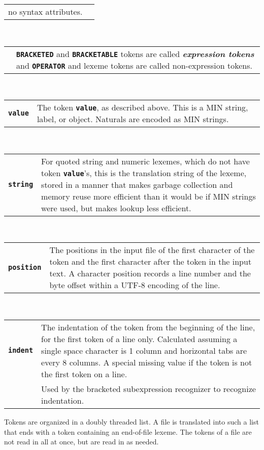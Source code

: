 \documentclass[12pt]{article}
\makeatletter
\newcommand{\TT}[1]{{\tt \bfseries #1}}
\newcommand{\skey}[2]{{\bf \em #1#2}\index{#1}}
\newcommand{\ttmkey}[2]{\TT{#1}\index{#1@{\tt #1}!#2}}
\newenvironment{indpar}[1][0.3in]%
	{\begin{list}{}%
		     {\setlength{\itemsep}{0in}%
		      \setlength{\topsep}{0in}%
		      \setlength{\parsep}{1ex}%
		      \setlength{\labelwidth}{#1}%
		      \setlength{\leftmargin}{#1}%
		      \addtolength{\leftmargin}{\labelsep}}%
	 \item}%
	{\end{list}}
\makeatother
\begin{document}
\begin{indpar}
\begin{tabular}{p{1in}p{4.5in}}
		  no syntax attri\-butes.
\end{tabular}
\\[1ex]  
\begin{tabular}{p{1in}p{4.5in}}
		& \TT{BRACKETED} and \TT{BRACKETABLE} tokens are called
		  \skey{expression token}s and \TT{OPERATOR} and lexeme
		  tokens are called non-expression tokens.
\end{tabular}
\\[1ex]
\begin{tabular}{p{1in}p{4.5in}}
\ttmkey{value}{of token}
		& The token \TT{value}, as described above.  This is
		  a MIN string, label, or object.  Naturals are encoded
		  as MIN strings.
\end{tabular}
\\[1ex]
\begin{tabular}{p{1in}p{4.5in}}
\ttmkey{string}{of token}
		& For quoted string and numeric lexemes,
		  which do not have token \TT{value}'s,
                  this is the translation string of the lexeme,
		  stored in a manner that makes
		  garbage collection and memory reuse more
		  efficient than it would be if MIN strings
		  were used, but makes lookup less efficient.
\end{tabular}
\\[1ex]
\begin{tabular}{p{1in}p{4.5in}}
\ttmkey{position}{of token}
		& The positions in the input file of
                  the first character of the token
		  and the first character after the token in the
		  input text.  A character position records a line number
		  and the byte offset within a UTF-8 encoding
		  of the line.
\end{tabular}
\\[1ex]
\begin{tabular}{p{1in}p{4.5in}}
\ttmkey{indent}{of token}
	        & The indentation of the token from the beginning
                  of the line, for the first token of a line only.
		  Calculated assuming a single space character is
		  1 column and horizontal tabs are every 8 columns.
		  A special missing value if the token is not the
		  first token on a line.
		\\[1ex]
		& Used by the bracketed subexpression recognizer
		  to recognize indentation.
\end{tabular}
\end{indpar}

Tokens are organized in a doubly threaded list.  A file is translated into
such a list that ends with a token containing an end-of-file
lexeme.
The tokens of a file are not read in all at once, but are read in as
needed.
\end{document}
